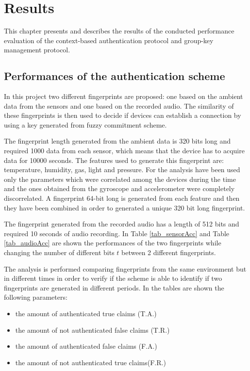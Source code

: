 \chapter{Results} 
\label{ch:results}
This chapter presents and describes the results of the conducted performance evaluation of the context-based authentication protocol and group-key management protocol. 

\section{Performances of the authentication scheme}
In this project two different fingerprints are proposed: one based on the ambient data from the sensors and one based on the recorded audio.
The similarity of these fingerprints is then used to decide if devices can establish a connection by using a key generated from fuzzy commitment scheme.

The fingerprint length generated from the ambient data is 320 bits long and required 1000 data from each sensor, which means that the device has to acquire data for 10000 seconds.
The features used to generate this fingerprint are: temperature, humidity, gas, light and  pressure.
For the analysis have been used only the parameters which were correlated among the devices during the time and the ones obtained from the gyroscope and accelerometer were completely discorrelated.
A fingerprint 64-bit long is generated from each feature and then they have been combined in order to generated a unique 320 bit long fingerprint.

The fingerprint generated from the recorded audio has a length of 512 bits and required 10 seconds of audio recording.
In Table \ref{tab_sensorAcc} and Table \ref{tab_audioAcc} are shown the performances of the two fingerprints while changing the number of different bits $t$ between 2 different fingerprints.

The analysis is performed comparing fingerprints from the same environment but in different times in order to verify if the scheme is able to identify if two fingerprints are generated in different periods.
In the tables are shown the following parameters: 
\begin{itemize}
    \item the amount of authenticated true claims (T.A.) 
    \item the amount of not authenticated false claims (T.R.)
    \item the amount of authenticated false claims (F.A.)
    \item the amount of not authenticated true claims(F.R.)
\end{itemize}

